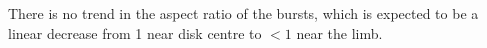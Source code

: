 There is no trend in the aspect ratio of the bursts, which is expected to be a linear decrease from 1 near disk centre to $< 1$ near the limb. 

\begin{table}


\end{table}
